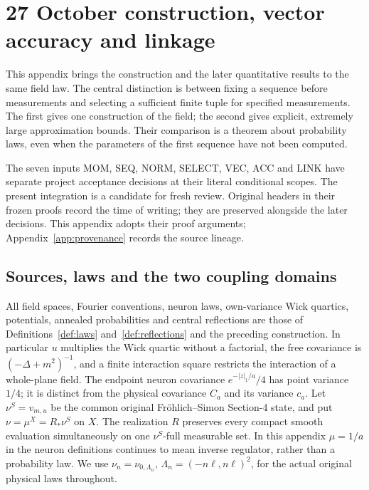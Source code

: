 \documentclass[11pt]{article}
\theoremstyle{plain}
\theoremstyle{definition}
\theoremstyle{remark}
\begin{document}
\section{27 October construction, vector accuracy and linkage}
\label{vqal:current}

This appendix brings the construction and the later quantitative results
to the same field law. The central distinction is between fixing a
sequence before measurements and selecting a sufficient finite tuple for
specified measurements. The first gives one construction of the field;
the second gives explicit, extremely large approximation bounds. Their
comparison is a theorem about probability laws, even when the parameters
of the first sequence have not been computed.

The seven inputs MOM, SEQ, NORM, SELECT, VEC, ACC and LINK have separate
project acceptance decisions at their literal conditional scopes.
The present integration is a candidate for fresh review. Original headers
in their frozen proofs record the time of writing; they are preserved
alongside the later decisions. This appendix adopts their proof arguments;
Appendix~\ref{app:provenance} records the source lineage.

\subsection{Sources, laws and the two coupling domains}
\label{vqal:premises}

All field spaces, Fourier conventions, neuron laws, own-variance Wick
quartics, potentials, annealed probabilities and central reflections are
those of Definitions~\ref{def:laws} and~\ref{def:reflections} and the
preceding construction. In particular $u$ multiplies the Wick quartic
without a factorial, the free covariance is $(-\Delta+m^2)^{-1}$, and a
finite interaction square restricts the interaction of a whole-plane
field. The endpoint neuron covariance $e^{-|z|_1/a}/4$ has point variance
$1/4$; it is distinct from the physical covariance $C_a$ and its variance
$c_a$. Let $\nu^S=v_{m,u}$ be the common original Fr\"ohlich--Simon
Section-4 state, and put $\nu=\mu^X=R_*\nu^S$ on $X$. The realization $R$
preserves every compact smooth evaluation simultaneously on one
$\nu^S$-full measurable set. In this appendix $\mu=1/a$ in the neuron
definitions continues to mean inverse regulator, rather than a probability
law. We use $\nu_n=\nu_{0,\Lambda_n}$, $\Lambda_n=(-n\ell,n\ell)^2$,
for the actual original physical laws throughout.
\end{document}
